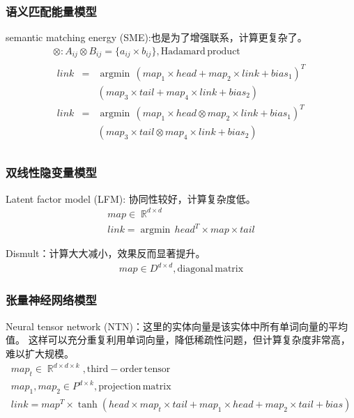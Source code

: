 \documentclass[12pt]{ctexart}
\DeclareMathOperator\argmin{argmin}
\DeclareMathOperator\R{\mathbb{R}}
\theoremstyle{definition}
\begin{document}
\subsubsection{语义匹配能量模型}
semantic matching energy (SME):也是为了增强联系，计算更复杂了。
\[\begin{array}{l}
    \otimes: A_{ij}\otimes B_{ij}=\{a_{ij}\times b_{ij}\},\mathrm{Hadamard\,product}\\
    \begin{array}{lll}
        link&=&{\argmin}\,(map_1\times head+map_2 \times link+bias_1)^T\\
        &&(map_3\times tail+map_4 \times link+bias_2)\\
        link&=&{\argmin}\,(map_1\times head\otimes map_2 \times link+bias_1)^T\\
        &&(map_3\times tail\otimes map_4 \times link+bias_2)\\
    \end{array}
\end{array}\]

\subsubsection{双线性隐变量模型}
Latent factor model (LFM): 协同性较好，计算复杂度低。
\[\begin{array}{l}
    map\in \R^{d\times d}\\
    link={\argmin}\,head^T\times map\times tail
\end{array}\]

Dismult：计算大大减小，效果反而显著提升。
\[\begin{array}{l}
    map\in D^{d\times d}, \mathrm{diagonal\,matrix}
\end{array}\]

\subsubsection{张量神经网络模型}
Neural tensor network (NTN)：这里的实体向量是该实体中所有单词向量的平均值。
这样可以充分重复利用单词向量，降低稀疏性问题，但计算复杂度非常高，难以扩大规模。
\[\begin{array}{l}
    map_t \in \R^{d\times d\times k}, \mathrm{third-order \,tensor}\\
    map_1, map_2 \in P^{d\times k}, \mathrm{projection \,matrix}\\
    link=map^T \times \tanh(head \times map_t \times tail+map_1\times head+map_2\times tail+bias)
\end{array}\]
\end{document}

